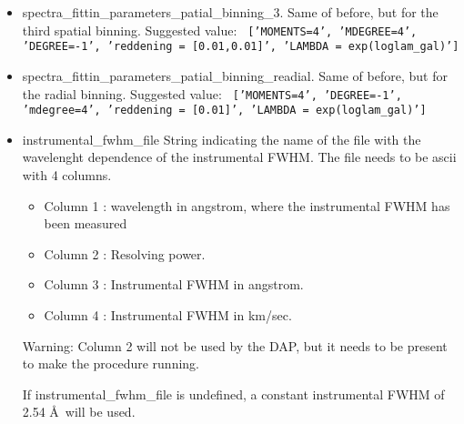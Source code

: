 \begin{itemize}
  \item spectra\_fittin\_parameters\_patial\_binning\_3.  Same of
    before, but for the third spatial binning. Suggested value: {\tt
      ['MOMENTS=4', 'MDEGREE=4', 'DEGREE=-1', 'reddening =
        [0.01,0.01]', 'LAMBDA = exp(loglam\_gal)']}

  \item spectra\_fittin\_parameters\_patial\_binning\_readial.  Same
    of before, but for the radial binning. Suggested value: {\tt
      ['MOMENTS=4', 'DEGREE=-1', 'mdegree=4', 'reddening = [0.01]',
        'LAMBDA = exp(loglam\_gal)']}

  \item instrumental\_fwhm\_file String indicating the name of the
    file with the wavelenght dependence of the instrumental FWHM. The
    file needs to be ascii with 4 columns.

  \begin{itemize}
     \item Column 1 : wavelength in angstrom, where the instrumental
       FWHM has been measured
     \item Column 2 : Resolving power.
     \item Column 3 : Instrumental FWHM in angstrom.
     \item Column 4 : Instrumental FWHM in km/sec.
  \end{itemize}

  Warning: Column 2 will not be used by the DAP, but it needs to be
  present to make the procedure running.

  If instrumental\_fwhm\_file is undefined, a constant instrumental
  FWHM of 2.54 \AA\ will be used.

\end{itemize}
